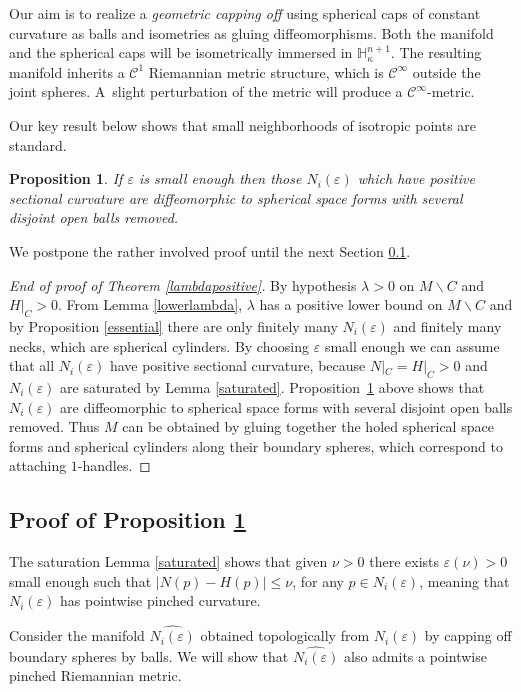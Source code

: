 \documentclass[JEP,XML,SOM,Unicode]{cedram}
\let\mathcal\mathscr
\let\moins\smallsetminus
\let\epsilon\varepsilon
\newtheorem{proposition}[theorem]{Proposition}
\theoremstyle{definition}
\theoremstyle{remark}
\numberwithin{equation}{section}
\begin{document}
Our aim is to realize a \emph{geometric capping off} using spherical caps of constant curvature as balls and
isometries as gluing diffeomorphisms. Both the manifold and the spherical caps will be isometrically immersed in
$\mathbb H_{\kappa}^{n+1}$. The resulting manifold inherits a $\mathcal C^1$ Riemannian metric structure, which is
$\mathcal C^{\infty}$ outside the joint spheres. A~slight perturbation of the metric will produce a $\mathcal C^{\infty}$-metric.

Our key result below shows that small neighborhoods of isotropic points
are standard.

\begin{proposition}\label{isotrop}
If $\varepsilon$ is small enough
then those $N_i(\varepsilon)$ which have positive sectional curvature are
diffeomorphic to spherical space forms with several disjoint open balls
removed.
\end{proposition}
We postpone the rather involved proof until the next Section \ref{isotrop-proof}.

\begin{proof}[End of proof of Theorem \ref{lambdapositive}]
By hypothesis $\lambda >0$ on $M\moins C$ and $H|_C >0$. From
Lemma \ref{lowerlambda}, $\lambda$ has a positive lower bound on $M\moins C$ and
by Proposition \ref{essential} there are only finitely many $N_i(\varepsilon)$ and finitely many necks, which are spherical cylinders.
By choosing $\varepsilon$ small enough we can assume that all $N_i(\varepsilon)$ have positive sectional
curvature, because $N|_C=H|_C>0$ and $N_i(\varepsilon)$ are saturated by Lemma \ref{saturated}. Proposition~\ref{isotrop} above shows that
$N_i(\varepsilon)$ are diffeomorphic to spherical space forms with several disjoint open balls removed.
Thus $M$ can be obtained by gluing together the holed spherical space forms and spherical cylinders along
their boundary spheres, which correspond to attaching $1$\nobreakdash-handles.
\end{proof}


\subsection{Proof of Proposition \ref{isotrop}}\label{isotrop-proof}
The saturation Lemma \ref{saturated} shows that
given $\nu>0$ there exists $\epsilon(\nu) >0$ small enough such that
$|N(p)-H(p)| \leq \nu $, for any $p\in N_i(\varepsilon)$, meaning that
$N_i(\varepsilon)$ has pointwise pinched curvature.

Consider the manifold $\widehat{N_i(\varepsilon)}$ obtained
topologically from $N_i(\varepsilon)$ by capping off boundary spheres by balls. We will show
that $\widehat{N_i(\varepsilon)}$ also admits a pointwise pinched Riemannian metric.
\end{document}
